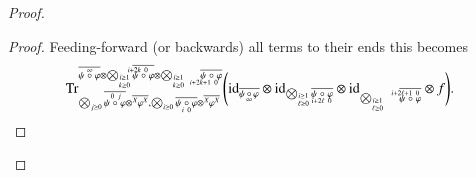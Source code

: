 \documentclass{amsart}
\def\tn{\textnormal}
\def\Trace{\tn{Tr}}
\def\ol{\overline}
\def\id{\tn{id}}
\newcommand{\feeddd}[3]{{\tensor*[^{#2}_{\color{white}{!}}]{{#1}}{^{#3}}}}%
\theoremstyle{remark}
\theoremstyle{definition}
\begin{document}
\begin{proof}
\begin{proof}
Feeding-forward (or backwards) all terms to their ends this becomes
 \begin{align*}
  \Trace^{\ol{\psi\;\accentset{\infty}{\circ}\;\varphi}\otimes\bigotimes_{\substack{\scriptscriptstyle i\ge1\\ \scriptscriptstyle k\ge0}}\ol{\psi\;\accentset{i+2k\ 0\ \ \ \,}{\circ}\;\varphi}\otimes\bigotimes_{\substack{\scriptscriptstyle i\ge1\\ \scriptscriptstyle k\ge0}}\quad\ol{\psi\;\underaccent{i+2k+1\ 0\ \ \ \ }{\circ}\;\varphi}}_{\bigotimes_{j\ge0}\ol{\psi\;\accentset{\,0\ j}{\circ}\;\varphi}\otimes\ol{\feeddd{\varphi}{X}{X}},\bigotimes_{i\ge0}\ol{\psi\;\underaccent{\,i\ 0}{\circ}\;\varphi}\otimes\ol{\feeddd{\varphi}{X}{X}}}
\Bigg(\id_{\ol{\psi\,\underaccent{\,\infty}{\circ}\,\varphi}}\otimes\id_{\bigotimes_{\substack{\scriptscriptstyle i\ge1\\ \scriptscriptstyle \ell\ge0}}\ol{\psi\;\underaccent{i+2\ell\ 0}{\circ}\;\varphi}}\otimes \id_{\bigotimes_{\substack{\scriptscriptstyle i\ge1\\ \scriptscriptstyle \ell\ge0}}\quad\ol{\psi\;\accentset{i+2\ell+1\ 0\ \ \ }{\circ}\;\varphi}}\otimes f\Bigg).
\end{align*}


\end{proof}
\end{proof}
\end{document}
